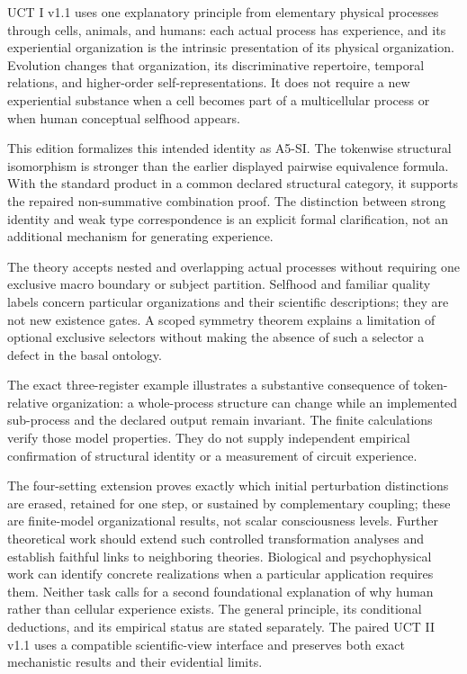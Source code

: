 \documentclass[
  11pt,
  a4paper,
]{article}
\begin{document}
UCT I v1.1 uses one explanatory principle from elementary physical
processes through cells, animals, and humans: each actual process has
experience, and its experiential organization is the intrinsic
presentation of its physical organization. Evolution changes that
organization, its discriminative repertoire, temporal relations, and
higher-order self-representations. It does not require a new
experiential substance when a cell becomes part of a multicellular
process or when human conceptual selfhood appears.

This edition formalizes this intended identity as A5-SI. The tokenwise
structural isomorphism is stronger than the earlier displayed pairwise
equivalence formula. With the standard product in a common declared
structural category, it supports the repaired non-summative combination
proof. The distinction between strong identity and weak type
correspondence is an explicit formal clarification, not an additional
mechanism for generating experience.

The theory accepts nested and overlapping actual processes without
requiring one exclusive macro boundary or subject partition. Selfhood
and familiar quality labels concern particular organizations and their
scientific descriptions; they are not new existence gates. A scoped
symmetry theorem explains a limitation of optional exclusive selectors
without making the absence of such a selector a defect in the basal
ontology.

The exact three-register example illustrates a substantive consequence
of token-relative organization: a whole-process structure can change
while an implemented sub-process and the declared output remain
invariant. The finite calculations verify those model properties. They
do not supply independent empirical confirmation of structural identity
or a measurement of circuit experience.

The four-setting extension proves exactly which initial perturbation
distinctions are erased, retained for one step, or sustained by
complementary coupling; these are finite-model organizational results,
not scalar consciousness levels. Further theoretical work should extend
such controlled transformation analyses and establish faithful links to
neighboring theories. Biological and psychophysical work can identify
concrete realizations when a particular application requires them.
Neither task calls for a second foundational explanation of why human
rather than cellular experience exists. The general principle, its
conditional deductions, and its empirical status are stated separately.
The paired UCT II v1.1 uses a compatible scientific-view interface and
preserves both exact mechanistic results and their evidential limits.
\end{document}
